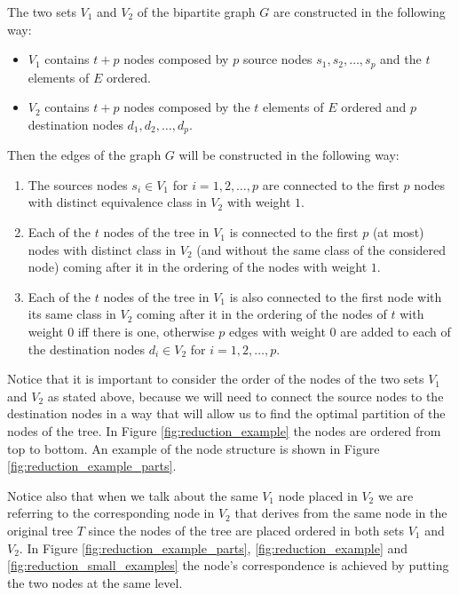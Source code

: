 \begin{definition} \label{def:bip_construction}
    The two sets $V_1$ and $V_2$ of the bipartite graph $G$ are constructed in the following way:
    \begin{itemize}
        \item $V_1$ contains $t + p$ nodes composed by $p$ source nodes $s_1, s_2, \dots, s_p$ and the $t$ elements of $E$ ordered.
        \item $V_2$ contains $t + p$ nodes composed by the $t$ elements of $E$ ordered and $p$ destination nodes $d_1, d_2, \dots, d_p$.
    \end{itemize}

    Then the edges of the graph $G$ will be constructed in the following way:
    \begin{enumerate}
        \item The sources nodes $s_i \in V_1$ for $i = 1, 2, \dots, p$ are connected to the first $p$ nodes with distinct equivalence class in $V_2$ with weight $1$.
        \item Each of the $t$ nodes of the tree in $V_1$ is connected to the first $p$ (at most) nodes with distinct class in $V_2$ (and without the same class of the considered node) coming after it in the ordering of the nodes  with weight $1$.
        \item Each of the $t$ nodes of the tree in $V_1$ is also connected to the first node with its same class in $V_2$ coming after it in the ordering of the nodes of $t$ with weight $0$ iff there is one, otherwise $p$ edges with weight $0$ are added to each of the destination nodes $d_i \in V_2$ for $i = 1, 2, \dots, p$.
    \end{enumerate}
\end{definition}

Notice that it is important to consider the order of the nodes of the two sets $V_1$ and $V_2$ as stated above, because we will need to connect the source nodes to the destination nodes in a way that will allow us to find the optimal partition of the nodes of the tree. In Figure \ref{fig:reduction_example} the nodes are ordered from top to bottom. An example of the node structure is shown in Figure \ref{fig:reduction_example_parts}.

Notice also that when we talk about the same $V_1$ node placed in $V_2$ we are referring to the corresponding node in $V_2$ that derives from the same node in the original tree $T$ since the nodes of the tree are placed ordered in both sets $V_1$ and $V_2$. In Figure \ref{fig:reduction_example_parts}, \ref{fig:reduction_example} and \ref{fig:reduction_small_examples} the node's correspondence is achieved by putting the two nodes at the same level.


